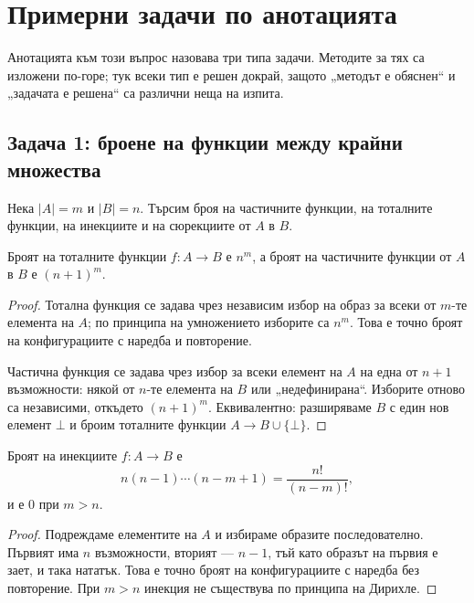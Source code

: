 \section{Примерни задачи по анотацията}\label{s:2.5}

Анотацията към този въпрос назовава три типа задачи. Методите за тях са
изложени по-горе; тук всеки тип е решен докрай, защото „методът е обяснен“ и
„задачата е решена“ са различни неща на изпита.

\subsection{Задача 1: броене на функции между крайни множества}\label{s:2.5.1}

Нека $|A|=m$ и $|B|=n$. Търсим броя на частичните функции, на тоталните
функции, на инекциите и на сюрекциите от $A$ в $B$.

\begin{prop}
Броят на тоталните функции $f:A\to B$ е $n^m$, а броят на частичните функции от
$A$ в $B$ е $(n+1)^m$.
\end{prop}
\begin{proof}
Тотална функция се задава чрез независим избор на образ за всеки от $m$-те
елемента на $A$; по принципа на умножението изборите са $n^m$. Това е точно
броят на конфигурациите с наредба и повторение.

Частична функция се задава чрез избор за всеки елемент на $A$ на една от $n+1$
възможности: някой от $n$-те елемента на $B$ или „недефинирана“. Изборите отново
са независими, откъдето $(n+1)^m$. Еквивалентно: разширяваме $B$ с един нов
елемент $\bot$ и броим тоталните функции $A\to B\cup\{\bot\}$.
\end{proof}

\begin{prop}[Инекции]
Броят на инекциите $f:A\to B$ е
\[
n(n-1)\cdots(n-m+1)=\frac{n!}{(n-m)!},
\]
и е $0$ при $m>n$.
\end{prop}
\begin{proof}
Подреждаме елементите на $A$ и избираме образите последователно. Първият има $n$
възможности, вторият --- $n-1$, тъй като образът на първия е зает, и така
нататък. Това е точно броят на конфигурациите с наредба без повторение. При
$m>n$ инекция не съществува по принципа на Дирихле.
\end{proof}

